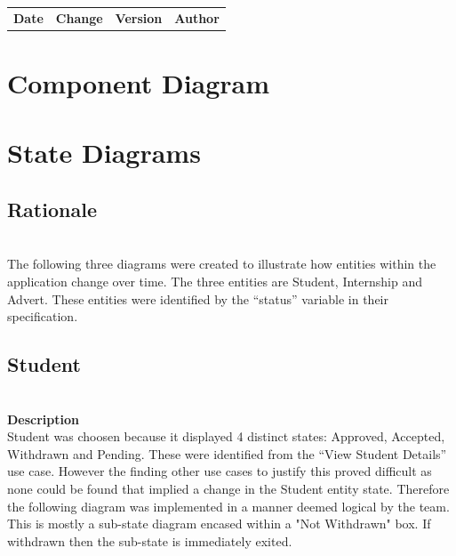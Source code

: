 \documentclass{l3deliverable}
\begin{document}
\begin{center}{
\begin{tabular}{|c|c|c|c|}
\hline \textbf{Date} &\textbf{ Change} & \textbf{Version} &\textbf{Author}\\ 
\end{tabular} }
\end{center}


\section{Component Diagram}


\section{State Diagrams}

\subsection{Rationale} \\

The following three diagrams were created to illustrate how entities within the application change over time. The three entities are Student, Internship and Advert. These entities were identified by the ``status'' variable in their specification. \\

\subsection{Student}\\
\textbf{Description} \\

Student was choosen because it displayed 4 distinct states: Approved, Accepted, Withdrawn and Pending. These were identified from the ``View Student Details'' use case. However the finding other use cases to justify this proved difficult as none could be found that implied a change in the Student entity state. Therefore the following diagram was implemented in a manner deemed logical by the team. This is mostly a sub-state diagram encased within a "Not Withdrawn" box. If withdrawn then the sub-state is immediately exited.
\end{document}

